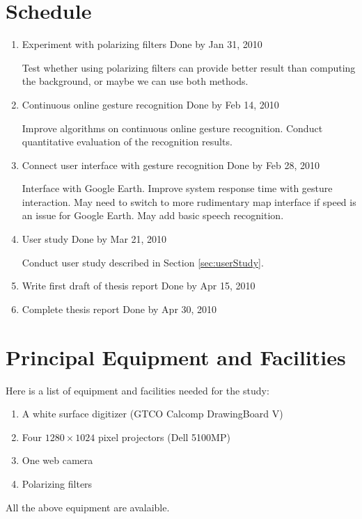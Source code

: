 \section{Schedule}
\begin{enumerate}
	\item Experiment with polarizing filters \hfill Done by Jan 31, 2010
	
	Test whether using polarizing filters can provide better result than computing the background, or maybe we can use both methods.
	
	\item Continuous online gesture recognition \hfill Done by Feb 14, 2010
	
	Improve algorithms on continuous online gesture recognition. Conduct quantitative evaluation of the recognition results. 
	
	\item Connect user interface with gesture recognition	\hfill Done by Feb 28, 2010
	
	Interface with Google Earth. Improve system response time with gesture interaction. May need to switch to more rudimentary map interface if speed is an issue for Google Earth. May add basic speech recognition.
	 
	\item User study \hfill Done by Mar 21, 2010
	
	Conduct user study described in Section \ref{sec:userStudy}.
	
	\item Write first draft of thesis report \hfill Done by Apr 15, 2010
	\item Complete thesis report	\hfill Done by Apr 30, 2010
	\end{enumerate}
	
\section{Principal Equipment and Facilities}
Here is a list of equipment and facilities needed for the study:

\begin{enumerate}
	\item A white surface digitizer (GTCO Calcomp DrawingBoard V)
	\item Four $1280\times1024$ pixel projectors (Dell 5100MP)
	\item One web camera
	\item Polarizing filters
\end{enumerate}

All the above equipment are avalaible.

